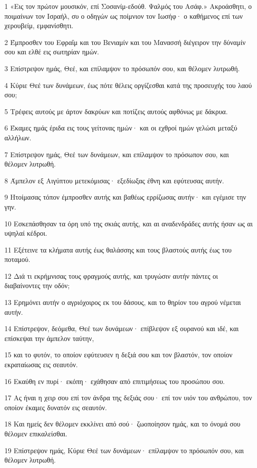 \par 1 «Εις τον πρώτον μουσικόν, επί Σοσανίμ-εδούθ. Ψαλμός του Ασάφ.» Ακροάσθητι, ο ποιμαίνων τον Ισραήλ, συ ο οδηγών ως ποίμνιον τον Ιωσήφ· ο καθήμενος επί των χερουβείμ, εμφανίσθητι.
\par 2 Έμπροσθεν του Εφραΐμ και του Βενιαμίν και του Μανασσή διέγειρον την δύναμίν σου και ελθέ εις σωτηρίαν ημών.
\par 3 Επίστρεψον ημάς, Θεέ, και επίλαμψον το πρόσωπόν σου, και θέλομεν λυτρωθή.
\par 4 Κύριε Θεέ των δυνάμεων, έως πότε θέλεις οργίζεσθαι κατά της προσευχής του λαού σου;
\par 5 Τρέφεις αυτούς με άρτον δακρύων και ποτίζεις αυτούς αφθόνως με δάκρυα.
\par 6 Έκαμες ημάς έριδα εις τους γείτονας ημών· και οι εχθροί ημών γελώσι μεταξύ αλλήλων.
\par 7 Επίστρεψον ημάς, Θεέ των δυνάμεων, και επίλαμψον το πρόσωπον σου, και θέλομεν λυτρωθή.
\par 8 Άμπελον εξ Αιγύπτου μετεκόμισας· εξεδίωξας έθνη και εφύτευσας αυτήν.
\par 9 Ητοίμασας τόπον έμπροσθεν αυτής και βαθέως ερρίζωσας αυτήν· και εγέμισε την γην.
\par 10 Εσκεπάσθησαν τα όρη υπό της σκιάς αυτής, και αι αναδενδράδες αυτής ήσαν ως αι υψηλαί κέδροι.
\par 11 Εξέτεινε τα κλήματα αυτής έως θαλάσσης και τους βλαστούς αυτής έως του ποταμού.
\par 12 Διά τι εκρήμνισας τους φραγμούς αυτής, και τρυγώσιν αυτήν πάντες οι διαβαίνοντες την οδόν;
\par 13 Ερημόνει αυτήν ο αγριόχοιρος εκ του δάσους, και το θηρίον του αγρού νέμεται αυτήν.
\par 14 Επίστρεψον, δεόμεθα, Θεέ των δυνάμεων· επίβλεψον εξ ουρανού και ιδέ, και επίσκεψαι την άμπελον ταύτην,
\par 15 και το φυτόν, το οποίον εφύτευσεν η δεξιά σου και τον βλαστόν, τον οποίον εκραταίωσας εις σεαυτόν.
\par 16 Εκαύθη εν πυρί· εκόπη· εχάθησαν από επιτιμήσεως του προσώπου σου.
\par 17 Ας ήναι η χειρ σου επί τον άνδρα της δεξιάς σου· επί τον υιόν του ανθρώπου, τον οποίον έκαμες δυνατόν εις σεαυτόν.
\par 18 Και ημείς δεν θέλομεν εκκλίνει από σού· ζωοποίησον ημάς, και το όνομά σου θέλομεν επικαλείσθαι.
\par 19 Επίστρεψον ημάς, Κύριε Θεέ των δυνάμεων· επίλαμψον το πρόσωπόν σου, και θέλομεν λυτρωθή.

